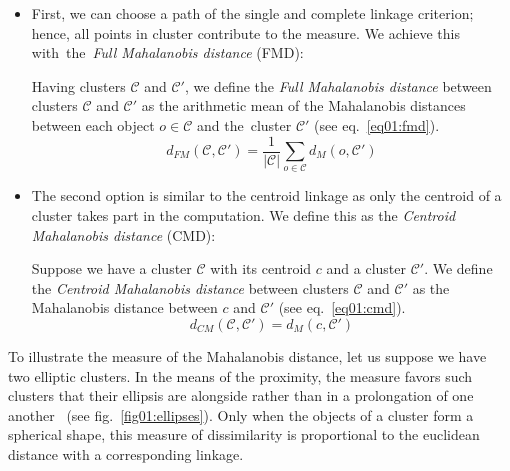 \begin{itemize}

\item
First, we can choose a path of the single and complete linkage criterion; hence, all points in cluster contribute to the measure. We achieve this with~the~\emph{Full Mahalanobis distance} (FMD):

\begin{defn}
	Having clusters $\mathcal{C}$ and $\mathcal{C}'$, we define the \emph{Full Mahalanobis distance} between clusters $\mathcal{C}$ and $\mathcal{C}'$ as the arithmetic mean of the Mahalanobis distances between each object $o \in \mathcal{C}$ and the~cluster $\mathcal{C}'$ (see eq.~\ref{eq01:fmd}).
	\begin{equation}\label{eq01:fmd}
	d_{FM}(\mathcal{C},\mathcal{C}') =\frac{1}{|\mathcal{C}|}\sum_{o\in\mathcal{C}}{d_M(o,\mathcal{C}')}
	\end{equation}
	\label{def01:fmd}
\end{defn}

\item
The second option is similar to the centroid linkage as only the centroid of a cluster takes part in the computation. We define this as the \emph{Centroid Mahalanobis distance} (CMD):

\begin{defn}
	Suppose we have a cluster $\mathcal{C}$ with its centroid $c$ and a cluster $\mathcal{C}'$. We define the \emph{Centroid Mahalanobis distance} between clusters $\mathcal{C}$ and $\mathcal{C}'$ as the Mahalanobis distance between $c$ and $\mathcal{C}'$ (see eq.~\ref{eq01:cmd}).
	\begin{equation}\label{eq01:cmd}
	d_{CM}(\mathcal{C},\mathcal{C}')=d_M(c,\mathcal{C}')
	\end{equation}
	\label{def01:cmd}
\end{defn}

\end{itemize}

To illustrate the measure of the Mahalanobis distance, let us suppose we have two elliptic clusters. In the means of the proximity, the measure favors such clusters that their ellipsis are alongside rather than in a prolongation of one another~\cite{dagnelie1991using} (see fig.~\ref{fig01:ellipses}). Only when the objects of a cluster form a spherical shape, this measure of dissimilarity is proportional to the euclidean distance with a corresponding linkage.

